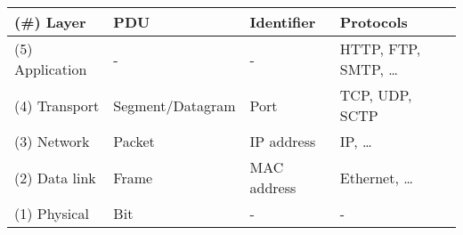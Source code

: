 \begin{tabular}{|l|l|l|l|}
  \hline
  (\#) Layer      & PDU              & Identifier  & Protocols              \\ \hline
  (5) Application & -                & -           & HTTP, FTP, SMTP, \dots \\
  (4) Transport   & Segment/Datagram & Port        & TCP, UDP, SCTP         \\
  (3) Network     & Packet           & IP address  & IP, \dots              \\
  (2) Data link   & Frame            & MAC address & Ethernet, \dots        \\
  (1) Physical    & Bit              & -           & -                      \\ \hline
\end{tabular}
